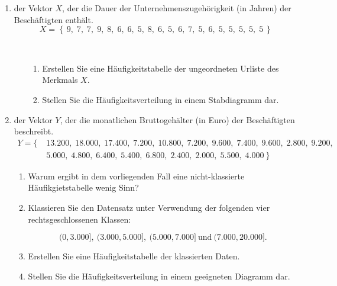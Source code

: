 \documentclass[12pt,a4paper]{article}
\begin{document}
\begin{enumerate}[label=(\alph*)]
  \item der Vektor $X$, der die Dauer der Unternehmenszugehörigkeit (in Jahren) der Beschäftigten enthält.
$$X = \left\{ \ 9, \; 7, \; 7, \; 9, \; 8, \; 6, \; 6, \; 5, \; 8, \; 6, \; 5, \; 6, \; 7, \; 5 , \; 6, \; 5, \; 5, \; 5, \; 5, \; 5 \ \right\}
$$
\vspace*{-1.5cm}
\begin{itemize}
\item[$\;$] $\;$
\begin{enumerate}[label=(\roman*)]
  \item Erstellen Sie eine Häufigkeitstabelle der ungeordneten Urliste des Merkmals $X$. 
  \item Stellen Sie die Häufigkeitsverteilung in einem Stabdiagramm dar.
\end{enumerate}
\end{itemize}
  \item der Vektor $Y$, der die monatlichen Bruttogehälter (in Euro) der Beschäftigten beschreibt.
\begin{align*}
Y = \{ & \; 13.200, \; 18.000, \; 17.400, \; 7.200, \; 10.800, \; 7.200, \; 9.600, \; 7.400, \; 9.600, \; 2.800 , \; 9.200, \\
& \; 5.000, \; 4.800, \; 6.400, \;5.400, \; 6.800, \; 2.400, \; 2.000, \; 5.500, \; 4.000 \ \}
\end{align*}

\begin{enumerate}[label=(\roman*)]
  \item Warum ergibt in dem vorliegenden Fall eine nicht-klassierte Häufikgietstabelle wenig Sinn?
  \item Klassieren Sie den Datensatz unter Verwendung der folgenden vier rechtsgeschlossenen
Klassen: 

$$(0, 3.000], \ (3.000, 5.000], \ (5.000, 7.000] \ \text{und} \ (7.000, 20.000].$$
  \item Erstellen Sie eine Häufigkeitstabelle der klassierten Daten.
  \item Stellen Sie die Häufigkeitsverteilung in einem geeigneten Diagramm dar.

\end{enumerate}
\end{enumerate}
\end{document}
